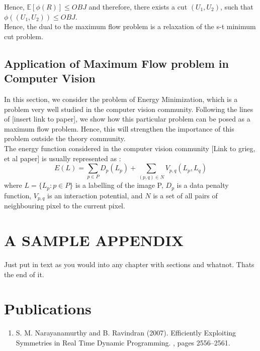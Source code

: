 \documentclass[BTech]{iitmdiss}
\begin{document}
	  Hence, $\mathbb{E}[\phi(R)] \leq OBJ$ and therefore, there exists a cut $(U_1,U_2)$, such that $\phi((U_1, U_2)) \leq OBJ$. \\
	  
	  Hence, the dual to the maximum flow problem is a relaxation of the s-t minimum cut problem.
	  
	  \section{Application of Maximum Flow problem in Computer Vision}
	    In this section, we consider the problem of Energy Minimization, which is a problem very well studied in the computer vision community.
	  Following the lines of [insert link to paper], we show how this particular problem can be posed as a maximum flow problem. Hence, this will
	  strengthen the importance of this problem outside the theory community. \\
	  
	  The energy function considered in the computer vision community [Link to grieg, et al paper] is usually represented as :
	  $$E(L) = \displaystyle\sum_{p \in P} D_{p}(L_{p}) + \displaystyle\sum_{(p,q) \in N} V_{p,q}(L_p, L_q)$$
	  where 
	  $L = \{L_p : p \in P\}$ is a labelling of the image P, $D_p$ is a data penalty function, $V_{p,q}$ is an interaction potential, and 
	  $N$ is a set of all pairs of neighbouring pixel to the current pixel.
	
 \chapter{A SAMPLE APPENDIX}
 
 Just put in text as you would into any chapter with sections and
 whatnot.  Thats the end of it.


\chapter*{Publications}
\vspace{-0.3cm}

\begin{enumerate}
\item S. M. Narayanamurthy and B. Ravindran (2007). \newblock
  Efficiently Exploiting Symmetries in Real Time Dynamic Programming. , pages 2556--2561.
\end{enumerate}


\pagebreak
\begin{singlespace}
  \begin{small}
	
  \end{small}
\end{singlespace}

\end{document}
